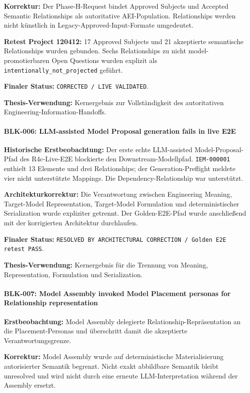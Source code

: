\textbf{Korrektur:}
Der Phase-H-Request bindet Approved Subjects und Accepted Semantic Relationships
als autoritative AEI-Population. Relationships werden nicht künstlich in
Legacy-Approved-Input-Formate umgedeutet.

\textbf{Retest Project 120412:}
17 Approved Subjects und 21 akzeptierte semantische Relationships wurden
gebunden. Sechs Relationships zu nicht model-promotierbaren Open Questions wurden
explizit als \texttt{intentionally\_not\_projected} geführt.

\textbf{Finaler Status:}
\texttt{CORRECTED / LIVE VALIDATED}.

\textbf{Thesis-Verwendung:}
Kernergebnis zur Vollständigkeit des autoritativen Engineering-Information-Handoffs.


\paragraph{BLK-006: LLM-assisted Model Proposal generation fails in live E2E}

\textbf{Historische Erstbeobachtung:}
Der erste echte LLM-assisted Model-Proposal-Pfad des R4c-Live-E2E blockierte den
Downstream-Modellpfad. \texttt{IEM-000001} enthielt 13 Elemente und drei
Relationships; der Generation-Preflight meldete vier nicht unterstützte Mappings.
Die Dependency-Relationship war unterstützt.

\textbf{Architekturkorrektur:}
Die Verantwortung zwischen Engineering Meaning, Target-Model Representation,
Target-Model Formulation und deterministischer Serialization wurde expliziter
getrennt. Der Golden-E2E-Pfad wurde anschließend mit der korrigierten Architektur
durchlaufen.

\textbf{Finaler Status:}
\texttt{RESOLVED BY ARCHITECTURAL CORRECTION / Golden E2E retest PASS}.

\textbf{Thesis-Verwendung:}
Kernergebnis für die Trennung von Meaning, Representation, Formulation und
Serialization.


\paragraph{BLK-007: Model Assembly invoked Model Placement personas for Relationship representation}

\textbf{Erstbeobachtung:}
Model Assembly delegierte Relationship-Repräsentation an die Placement-Personas
und überschritt damit die akzeptierte Verantwortungsgrenze.

\textbf{Korrektur:}
Model Assembly wurde auf deterministische Materialisierung autorisierter Semantik
begrenzt. Nicht exakt abbildbare Semantik bleibt unresolved und wird nicht durch
eine erneute LLM-Interpretation während der Assembly ersetzt.

